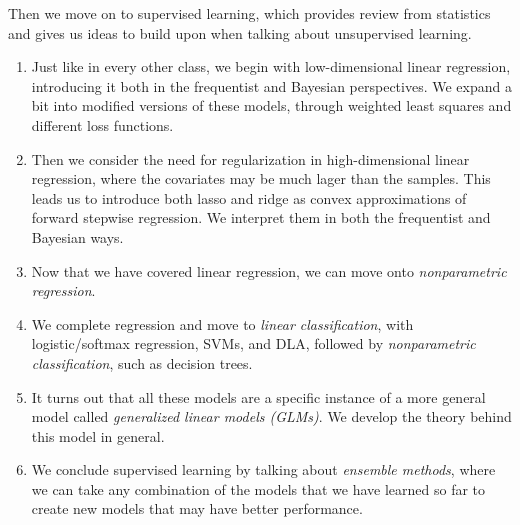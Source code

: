 Then we move on to supervised learning, which provides review from statistics and gives us ideas to build upon when talking about unsupervised learning. 
\begin{enumerate}
  \item Just like in every other class, we begin with low-dimensional linear regression, introducing it both in the frequentist and Bayesian perspectives. We expand a bit into modified versions of these models, through weighted least squares and different loss functions. 

  \item Then we consider the need for regularization in high-dimensional linear regression, where the covariates may be much lager than the samples. This leads us to introduce both lasso and ridge as convex approximations of forward stepwise regression. We interpret them in both the frequentist and Bayesian ways. 

  \item Now that we have covered linear regression, we can move onto \textit{nonparametric regression}. 

  \item We complete regression and move to \textit{linear classification}, with logistic/softmax regression, SVMs, and DLA, followed by \textit{nonparametric classification}, such as decision trees. 

  \item It turns out that all these models are a specific instance of a more general model called \textit{generalized linear models (GLMs)}. We develop the theory behind this model in general. 

  \item We conclude supervised learning by talking about \textit{ensemble methods}, where we can take any combination of the models that we have learned so far to create new models that may have better performance. 
\end{enumerate}

